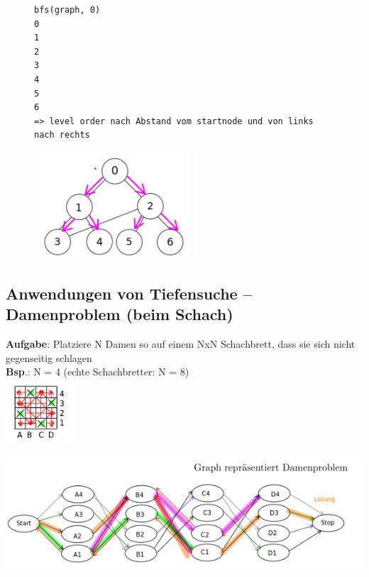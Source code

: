     \begin{figure}[htbp]
        \begin{minipage}[t]{11cm}
        \vspace{0cm}
            \begin{verbatim}
bfs(graph, 0)
0
1
2
3
4
5
6
=> level order nach Abstand vom startnode und von links nach rechts
            \end{verbatim}
        \end{minipage}
        \begin{minipage}[t]{6cm}
        \vspace{0.0cm}
        \includegraphics[width=6cm,height=4cm,keepaspectratio]{./Pictures/BFS.png}
        \end{minipage}
    \end{figure}

\newpage
    \subsection*{Anwendungen von Tiefensuche – Damenproblem (beim Schach)}
    \textbf{Aufgabe}: Platziere N Damen so auf einem NxN Schachbrett, dass sie sich nicht gegenseitig schlagen\\

    \textbf{Bsp}.: N = 4 \hspace*{1cm}(echte Schachbretter: N = 8)\\ \includegraphics[width=2.5cm,height=2.5cm,keepaspectratio]{./Pictures/Damenbrett.png}\\
    \includegraphics[width=14cm,height=5cm,keepaspectratio]{./Pictures/Damengraph.png}\\


